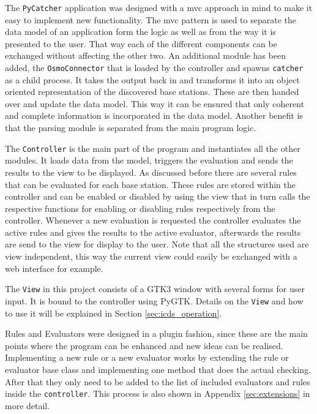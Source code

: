 The \texttt{PyCatcher} application was designed with a \gls{mvc} approach in mind to make it easy to implement new functionality.
The \gls{mvc} pattern is used to separate the data model of an application form the logic as well as from the way it is presented to the user.
That way each of the different components can be exchanged without affecting the other two.
An additional module has been added, the \texttt{OsmoConnector} that is loaded by the controller and spawns \texttt{catcher} as a child process.
It takes the output back in and transforms it into an object oriented representation of the discovered base stations.
These are then handed over and update the data model.
This way it can be ensured that only coherent and complete information is incorporated in the data model.
Another benefit is that the parsing module is separated from the main program logic.

The \texttt{Controller} is the main part of the program and instantiates all the other modules.
It loads data from the model, triggers the evaluation and sends the results to the view to be displayed.
As discussed before there are several rules that can be evaluated for each base station.
These rules are stored within the controller and can be enabled or disabled by using the view that in turn calls the respective functions for enabling or disabling rules respectively from the controller.
Whenever a new evaluation is requested the controller evaluates the active rules and gives the results to the active evaluator, afterwards the results are send to the view for display to the user.
Note that all the structures used are view independent, this way the current view could easily be exchanged with a web interface for example.

The \texttt{View} in this project consists of a GTK3 window with several forms for user input.
It is bound to the controller using PyGTK.
Details on the \texttt{View} and how to use it will be explained in Section \ref{sec:icds_operation}.

Rules and Evaluators were designed in a plugin fashion, since these are the main points where the program can be enhanced and new ideas can be realised.
Implementing a new rule or a new evaluator works by extending the rule or evaluator base class and implementing one method that does the actual checking.
After that they only need to be added to the list of included evaluators and rules inside the \texttt{controller}.
This process is also shown in Appendix \ref{sec:extensions} in more detail.

